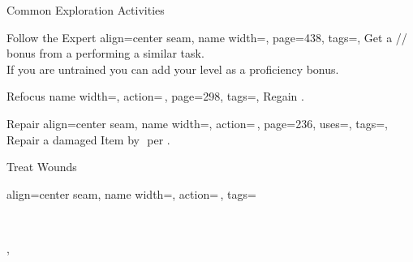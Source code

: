 \renewcommand{\PageBottomReferences}{%
    \hfill APG = Advanced Players Guide
    \hfill GMC = GM Core\\
    \hfill KCG = Kingmaker Companion Guide
    \hfill SoM = Secrets of Magic
    \hfill TV = Treasure Vault
}
\setlength{\parindent}{0mm}%
\begin{PageFrontLandscape}
    \begin{TablesHalf}{\frontTableHeight}
        \begin{Table}{Common Exploration Activities}
            \begin{entry}{Follow the Expert}{%
                align=center seam,
                name width=\activityLength,%
                page=438,
                tags=\Concentrate,
            }
                Get a \E{}/\M{}/\Le{}\,\Cirm bonus from a 
                performing a similar task.\\
                If you are untrained you can add your level as a proficiency bonus.
            \end{entry}
            \begin{entry}{Refocus}{%
                name width=\activityLength,%
                action=\,,
                page=298,
                tags=\Concentrate,
            }
                Regain  .
            \end{entry}
            \begin{entry}{Repair}{%
                align=center seam,%
                name width=\activityLength,%
                action=\,,
                page=236,
                uses={\Crafting[][before=Item]},%
                tags=\Manipulate,
            }
                Repair a damaged Item by \,\HPs{}\,\HPs per .\\
                \hfill
            \end{entry}
            \begin{entry}{Treat Wounds}{%
                align=center seam,
                name width=\activityLength,%
                action=\,,
                tags=\parbox{0.4\linewidth}{\raggedleft{}\,\Manipulate\Healing\\
                },
}
\end{entry}
\end{Table}
\end{TablesHalf}
\end{PageFrontLandscape}

